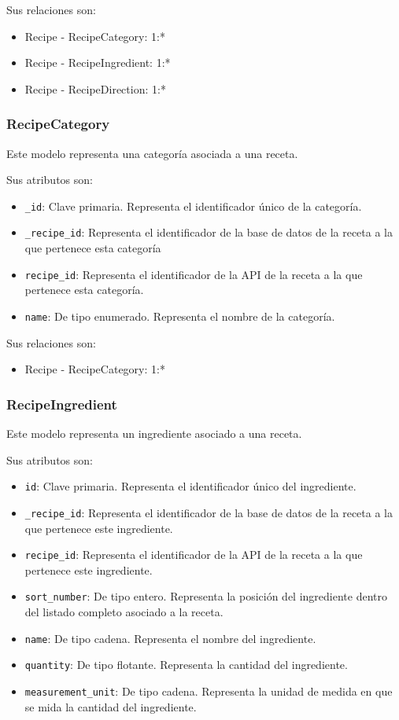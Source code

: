 Sus relaciones son:
\begin{itemize}
\item Recipe - RecipeCategory: 1:*
\item Recipe - RecipeIngredient: 1:*
\item Recipe - RecipeDirection: 1:*
\end{itemize}


\subsubsection{RecipeCategory}

Este modelo representa una categoría asociada a una receta.

Sus atributos son:
\begin{itemize}
\item \texttt{\_id}: Clave primaria. Representa el identificador único de la
  categoría.
\item \texttt{\_recipe\_id}: Representa el identificador de la base de datos de
  la receta a la que pertenece esta categoría
\item \texttt{recipe\_id}: Representa el identificador de la API de la receta
  a la que pertenece esta categoría.
\item \texttt{name}: De tipo enumerado. Representa el nombre de la categoría.
\end{itemize}

Sus relaciones son:
\begin{itemize}
\item Recipe - RecipeCategory: 1:*
\end{itemize}


\subsubsection{RecipeIngredient}

Este modelo representa un ingrediente asociado a una receta.

Sus atributos son:
\begin{itemize}
\item \texttt{id}: Clave primaria. Representa el identificador único del
  ingrediente.
\item \texttt{\_recipe\_id}: Representa el identificador de la base de datos de
  la receta a la que pertenece este ingrediente.
\item \texttt{recipe\_id}: Representa el identificador de la API de la receta
  a la que pertenece este ingrediente.
\item \texttt{sort\_number}: De tipo entero. Representa la posición del
  ingrediente dentro del listado completo asociado a la receta.
\item \texttt{name}: De tipo cadena. Representa el nombre del ingrediente.
\item \texttt{quantity}: De tipo flotante. Representa la cantidad del
  ingrediente.
\item \texttt{measurement\_unit}: De tipo cadena. Representa la unidad de
  medida en que se mida la cantidad del ingrediente.
\end{itemize}

